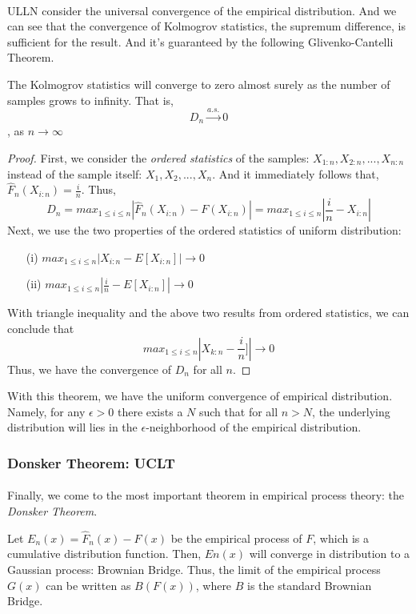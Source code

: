 \documentclass[final_project_1.tex]{subfiles}
\begin{document}
\paragraph{}
ULLN consider the universal convergence of the empirical distribution. And we can see that the convergence of Kolmogrov statistics, the supremum difference, is sufficient for the result. And it's guaranteed by the following Glivenko-Cantelli Theorem.
\begin{theorem}
The Kolmogrov statistics will converge to zero almost surely as the number of samples grows to infinity. That is,
$$D_n\xrightarrow{a.s.}0$$, as $n\rightarrow\infty$
\end{theorem}

\begin{proof}
First, we consider the {\it ordered statistics} of the samples: $X_{1:n}, X_{2:n}, ..., X_{n:n}$ instead of the sample itself: $X_1, X_2, ..., X_n$. And it immediately follows that,
$\hat{F}_n(X_{i:n})=\frac{i}{n}$. Thus, 
$$D_n=max_{1\leq i\leq n}|\hat{F}_n(X_{i:n})-F(X_{i:n})|=max_{1\leq i\leq n}|\frac{i}{n}-X_{i:n}|$$
Next, we use the two properties of the ordered statistics of uniform distribution:
\begin{enumerate}
\centering
\item[(i)] $max_{1\leq i\leq n}|X_{i:n}-E[X_{i:n}]|\rightarrow 0$
\item[(ii)]$max_{1\leq i\leq n}|\frac{i}{n}-E[X_{i:n}]|\rightarrow 0$
\end{enumerate}
With triangle inequality and the above two results from ordered statistics, we can conclude that
$$max_{1\leq i\leq n}|X_{k:n}-\frac{i}{n}]|\rightarrow 0$$
Thus, we have the convergence of $D_n$ for all $n$.
\end{proof}

With this theorem, we have the uniform convergence of empirical distribution. Namely, for any $\epsilon > 0$ there exists a $N$ such that for all $n>N$, the underlying distribution will lies in the $\epsilon$-neighborhood of the empirical distribution.

\subsubsection{Donsker Theorem: UCLT}
\paragraph{}
Finally, we come to the most important theorem in empirical process theory: the {\it Donsker Theorem}. 
\begin{theorem}[Donsker]
Let $E_n(x)=\hat{F}_n(x)-F(x)$ be the empirical process of $F$, which is a cumulative distribution function. Then, $En(x)$ will converge in distribution to a Gaussian process: Brownian Bridge. Thus, the limit of the empirical process $G(x)$ can be written as $B(F(x))$, where $B$ is the standard Brownian Bridge.
\end{theorem}
\end{document}
